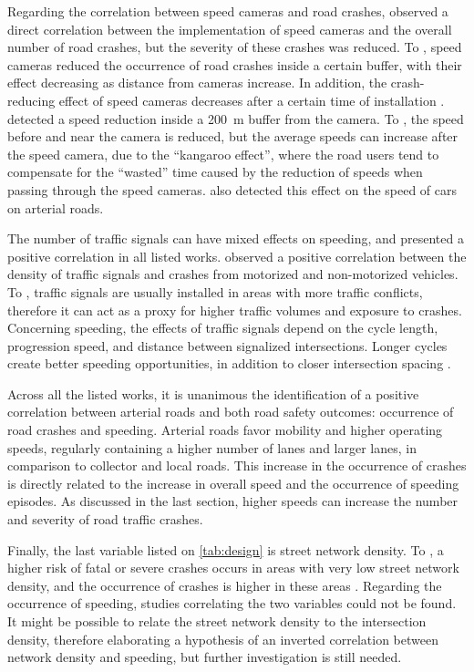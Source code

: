 Regarding the correlation between speed cameras and road crashes, \textcite{Park2019} observed a direct correlation between the implementation of speed cameras and the overall number of road crashes, but the severity of these crashes was reduced. To \textcite{Høye2015,Li2013a}, speed cameras reduced the occurrence of road crashes inside a certain buffer, with their effect decreasing as distance from cameras increase. In addition, the crash-reducing effect of speed cameras decreases after a certain time of installation \cite{Li2020}. \textcite{Li2013a,Oliveira2015} detected a speed reduction inside a 200 m buffer from the camera. To \textcite{Li2020}, the speed before and near the camera is reduced, but the average speeds can increase after the speed camera, due to the ``kangaroo effect'', where the road users tend to compensate for the ``wasted'' time caused by the reduction of speeds when passing through the speed cameras. \textcite{Amancio2021} also detected this effect on the speed of cars on arterial roads. 

The number of traffic signals can have mixed effects on speeding, and presented a positive correlation in all listed works. \textcite{Lovegrove2006,Lee2015} observed a positive correlation between the density of traffic signals and crashes from motorized and non-motorized vehicles. To \textcite{Obelheiro2020}, traffic signals are usually installed in areas with more traffic conflicts, therefore it can act as a proxy for higher traffic volumes and exposure to crashes. Concerning speeding, the effects of traffic signals depend on the cycle length, progression speed, and distance between signalized intersections. Longer cycles create better speeding opportunities, in addition to closer intersection spacing \cite{Elvik2009,Furth2018}. 

Across all the listed works, it is unanimous the identification of a positive correlation between arterial roads and both road safety outcomes: occurrence of road crashes and speeding. Arterial roads favor mobility and higher operating speeds, regularly containing a higher number of lanes and larger lanes, in comparison to collector and local roads. This increase in the occurrence of crashes is directly related to the increase in overall speed and the occurrence of speeding episodes. As discussed in the last section, higher speeds can increase the number and severity of road traffic crashes. 

Finally, the last variable listed on \autoref{tab:design} is street network density. To \textcite{Marshall2010}, a higher risk of fatal or severe crashes occurs in areas with very low street network density, and the occurrence of crashes is higher in these areas \cite{Marshall2011}. Regarding the occurrence of speeding, studies correlating the two variables could not be found. It might be possible to relate the street network density to the intersection density, therefore elaborating a hypothesis of an inverted correlation between network density and speeding, but further investigation  is still needed. 

